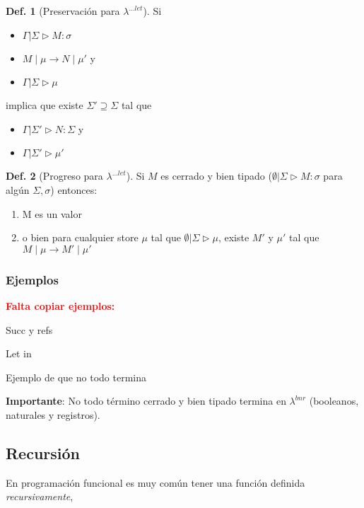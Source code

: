 \documentclass{report}
\theoremstyle{definition} %
\newtheorem{definition}{Def.}[chapter]
\newcommand{\todo}[1]{{\textcolor{red}{\textbf{#1}}}}
\newcommand{\tipa}[3]{#1 \rhd #2 : #3} %
\newcommand{\GStipa}[2]{\tipa{\Gamma|\Sigma}{#1}{#2}}
\newcommand{\compat}[2]{#1 \rhd #2} %
\newcommand{\GSCompat}[1]{\compat{\Gamma|\Sigma}{#1}} %
\newcommand{\lambdalet}{\lambda^{\dots let}}
\newcommand{\sreduce}[4]{\reduce{#1\mid#2}{#3\mid#4}}
\newcommand{\sreduceToPrime}[2]{\sreduce{#1}{#2}{#1'}{#2'}}
\newcommand{\reduces}{\to}
\newcommand{\reduce}[2]{#1 \reduces #2}
\begin{document}
\begin{definition}[Preservación para $\lambdalet$]
    Si
    \begin{itemize}
        \item $\GStipa{M}{\sigma}$
        \item $\sreduce{M}{\mu}{N}{\mu'}$ y
        \item $\GSCompat{\mu}$
    \end{itemize}
    
    implica que existe $\Sigma' \supseteq \Sigma$ tal que
    \begin{itemize}
        \item $\tipa{\Gamma|\Sigma'}{N}{\Sigma}$ y
        \item $\compat{\Gamma|\Sigma'}{\mu'}$
    \end{itemize}
\end{definition}

\begin{definition}[Progreso para $\lambdalet$]
    Si $M$ es cerrado y bien tipado ($\tipa{\emptyset|\Sigma}{M}{\sigma}$ para
    algún $\Sigma, \sigma$) entonces:

    \begin{enumerate}
        \item M es un valor
        \item o bien para cualquier store $\mu$ tal que
        $\compat{\emptyset|\Sigma}{\mu}$, existe $M'$ y $\mu'$ tal que $\sreduceToPrime{M}{\mu}$
    \end{enumerate}
\end{definition}

\subsubsection{Ejemplos}

\todo{Falta copiar ejemplos:}

Succ y refs

Let in

Ejemplo de que no todo termina

\textbf{Importante}: No todo término cerrado y bien tipado termina en
$\lambda^{bnr}$ (booleanos, naturales y registros).

\subsection{Recursión}

En programación funcional es muy común tener una función definida
\textit{recursivamente},
\end{document}
